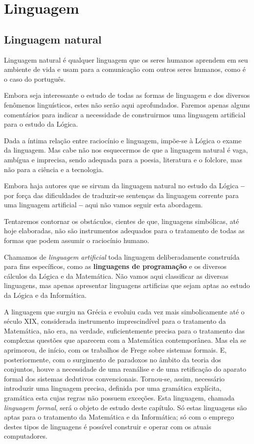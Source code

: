 
\chapter{Linguagem}
\section{Linguagem natural}

Linguagem natural é qualquer linguagem que os seres humanos aprendem em seu
ambiente de vida e usam para a comunicação com outros seres humanos, como é o
caso do português.

Embora seja interessante o estudo de todas as formas de linguagem e dos diversos
fenômenos linguísticos, estes não serão aqui aprofundados.
Faremos apenas alguns
comentários para indicar a necessidade de construirmos uma linguagem artificial
para o estudo da Lógica.

Dada a íntima relação entre raciocínio e linguagem, impõe-se à Lógica o exame da linguagem.
Mas cabe não nos esquecermos de que a linguagem natural é vaga, ambígua e imprecisa, sendo adequada para a poesia, literatura e o folclore, mas não para a ciência e a tecnologia.

Embora haja autores que se sirvam da linguagem natural no estudo da Lógica \textbf{--} por força das dificuldades de traduzir-se sentenças da linguagem corrente para uma linguagem artificial \textbf{--} aqui não vamos seguir esta abordagem.

Tentaremos contornar os obstáculos, cientes de que, linguagens simbólicas, até hoje elaboradas, não são instrumentos adequados para o tratamento de todas as formas que podem assumir o raciocínio humano.

\pagebreak

Chamamos de \emph{linguagem artificial}
toda linguagem deliberadamente construída para fins específicos, como as \textbf{linguagens de programação} e os diversos cálculos da Lógica e da Matemática.
Não vamos aqui classificar as diversas linguagens, mas apenas apresentar linguagens artificias que sejam aptas ao estudo da Lógica e da Informática.

A linguagem que surgiu na Grécia e evoluiu cada vez mais simbolicamente até o século XIX, considerada instrumento imprescindível para o tratamento da Matemática, não era, na verdade, suficientemente precisa para o tratamento das complexas questões que aparecem com a Matemática contemporânea.
Mas ela se aprimorou, de início, com os trabalhos de Frege sobre sistemas formais.
E, posteriormente, com o surgimento de paradoxos no âmbito da teoria dos conjuntos, houve a necessidade de uma reanálise e de uma retificação do aparato formal dos sistemas dedutivos convencionais.
Tornou-se, assim, necessário introduzir uma linguagem precisa, definida por uma gramática explícita, gramática esta cujas regras não possuem exceções.
Esta linguagem, chamada \emph{linguagem formal}, será o objeto de estudo deste capítulo.
Só estas linguagens são aptas para o tratamento da Matemática e da Informática;
só com o emprego destes tipos de linguagens é possível construir e operar com os atuais computadores.


